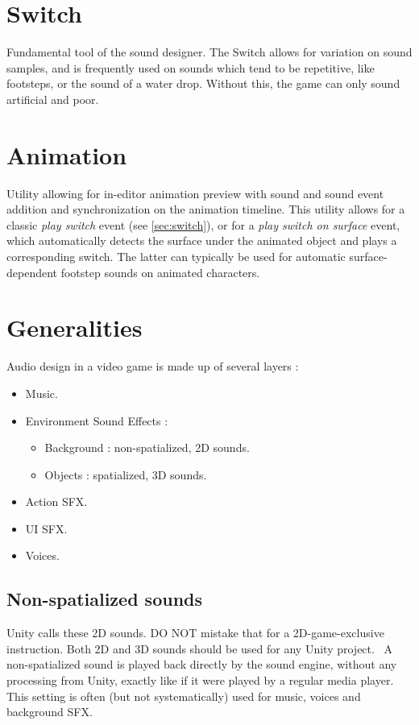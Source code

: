 \documentclass[a4paper,10pt]{article}
\begin{document}
\section{Switch} \label{sec:switch}

Fundamental tool of the sound designer. The Switch allows for variation on sound samples, and is frequently used on sounds which tend to be repetitive, like footsteps, or the sound of a water drop. Without this, the game can only sound artificial and poor.

\section{Animation}

Utility allowing for in-editor animation preview with sound and sound event addition and synchronization on the animation timeline. This utility allows for a classic \textit{play switch} event (see \autoref{sec:switch}), or for a \textit{play switch on surface} event, which automatically detects the surface under the animated object and plays a corresponding switch. The latter can typically be used for automatic surface-dependent footstep sounds on animated characters.


\section{Generalities} \label{sec:gen}

Audio design in a video game is made up of several layers : \begin{itemize}
\item Music.
\item Environment Sound Effects : 
	\begin{itemize}
	\item Background : non-spatialized, 2D sounds.
	\item Objects : spatialized, 3D sounds.
	\end{itemize}
\item Action SFX.
\item UI SFX.
\item Voices.
\end{itemize}


\subsection{Non-spatialized sounds}
Unity calls these 2D sounds. DO NOT mistake that for a 2D-game-exclusive instruction. Both 2D and 3D sounds should be used for any Unity project. \
A non-spatialized sound is played back directly by the sound engine, without any processing from Unity, exactly like if it were played by a regular media player. This setting is often (but not systematically) used for music, voices and background SFX. \\
\end{document}
